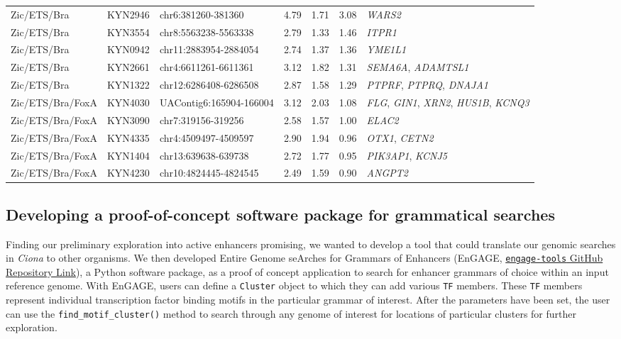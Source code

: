 \begin{small}
\begin{landscape}
\begin{longtable}{l l p{} p{} p{} p{} p{}}
            Zic/ETS/Bra & KYN2946 & chr6:381260-381360 & 4.79 & 1.71 & 3.08 & \textit{WARS2} \\
            Zic/ETS/Bra & KYN3554 & chr8:5563238-5563338 & 2.79 & 1.33 & 1.46 & \textit{ITPR1} \\
            Zic/ETS/Bra & KYN0942 & chr11:2883954-2884054 & 2.74 & 1.37 & 1.36 & \textit{YME1L1} \\
            Zic/ETS/Bra & KYN2661 & chr4:6611261-6611361 & 3.12 & 1.82 & 1.31 & \textit{SEMA6A}, \textit{ADAMTSL1} \\
            Zic/ETS/Bra & KYN1322 & chr12:6286408-6286508 & 2.87 & 1.58 & 1.29 & \textit{PTPRF}, \textit{PTPRQ}, \textit{DNAJA1} \\

            Zic/ETS/Bra/FoxA & KYN4030 & UAContig6:165904-166004 & 3.12 & 2.03 & 1.08 & \textit{FLG}, \textit{GIN1}, \textit{XRN2}, \textit{HUS1B}, \textit{KCNQ3} \\
            Zic/ETS/Bra/FoxA & KYN3090 & chr7:319156-319256 & 2.58 & 1.57 & 1.00 & \textit{ELAC2} \\
            Zic/ETS/Bra/FoxA & KYN4335 & chr4:4509497-4509597 & 2.90 & 1.94 & 0.96 & \textit{OTX1}, \textit{CETN2} \\
            Zic/ETS/Bra/FoxA & KYN1404 & chr13:639638-639738 & 2.72 & 1.77 & 0.95 & \textit{PIK3AP1}, \textit{KCNJ5} \\
            Zic/ETS/Bra/FoxA & KYN4230 & chr10:4824445-4824545 & 2.49 & 1.59 & 0.90 & \textit{ANGPT2} \\
        \end{longtable}
    \end{landscape}
\end{small}

\subsection{Developing a proof-of-concept software package for grammatical searches}

Finding our preliminary exploration into active enhancers promising, we wanted to develop a tool that could translate our genomic searches in \textit{Ciona} to other organisms. We then developed Entire Genome seArches for Grammars of Enhancers (EnGAGE, \href{https://github.com/mragsac/engage-tools}{\texttt{engage-tools} GitHub Repository Link}), a Python software package, as a proof of concept application to search for enhancer grammars of choice within an input reference genome. With EnGAGE, users can define a \verb|Cluster| object to which they can add various \verb|TF| members. These \verb|TF| members represent individual transcription factor binding motifs in the particular grammar of interest. After the parameters have been set, the user can use the \verb|find_motif_cluster()| method to search through any genome of interest for locations of particular clusters for further exploration.

